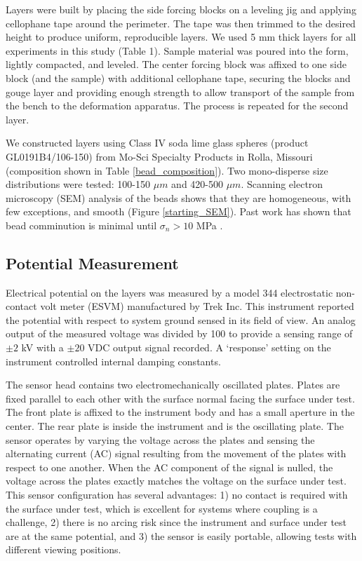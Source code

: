 Layers were built by placing the side forcing blocks on a leveling jig and applying cellophane tape around the perimeter.  The tape was then trimmed to the desired height to produce uniform, reproducible layers. We used 5 mm thick layers for all experiments in this study (Table 1).  Sample material was poured into the form, lightly compacted, and leveled.  The center forcing block was affixed to one side block (and the sample) with additional cellophane tape, securing the blocks and gouge layer and providing enough strength to allow transport of the sample from the bench to the deformation apparatus. The process is repeated for the second layer.

We constructed layers using Class IV soda lime glass spheres (product GL0191B4/106-150) from Mo-Sci Specialty Products in Rolla, Missouri (composition shown in Table \ref{bead_composition}).  Two mono-disperse size distributions were tested: 100-150 $\mu m$ and 420-500 $\mu m$. Scanning electron microscopy (SEM) analysis of the beads shows that they are homogeneous, with few exceptions, and smooth (Figure \ref{starting_SEM}). Past work has shown that bead comminution is minimal until $\sigma_n>10$ MPa \citep{Mair:2002hu,Mair:2011fd}.  

\subsection{Potential Measurement}
Electrical potential on the layers was measured by a model 344 electrostatic non-contact volt meter (ESVM) manufactured by Trek Inc.  This instrument reported the potential with respect to system ground sensed in its field of view. An analog output of the measured voltage was divided by 100 to provide a sensing range of $\pm 2$ kV with a $\pm 20$ VDC output signal recorded.  A `response' setting on the instrument controlled internal damping constants.

The sensor head contains two electromechanically oscillated plates.  Plates are fixed parallel to each other with the surface normal facing the surface under test.  The front plate is affixed to the instrument body and has a small aperture in the center. The rear plate is inside the instrument and is the oscillating plate.  The sensor operates by varying the voltage across the plates and sensing the alternating current (AC) signal resulting from the movement of the plates with respect to one another.  When the AC component of the signal is nulled, the voltage across the plates exactly matches the voltage on the surface under test.  This sensor configuration has several advantages: 1) no contact is required with the surface under test, which is excellent for systems where coupling is a challenge, 2) there is no arcing risk since the instrument and surface under test are at the same potential, and 3) the sensor is easily portable, allowing tests with different viewing positions.

